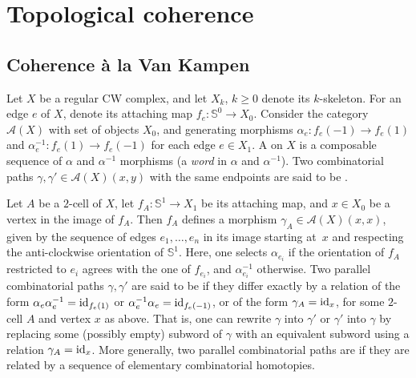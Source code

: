 
\section{Topological coherence} 
\label{s:polycoherence}


\subsection{Coherence \`a la Van Kampen}

Let $X$ be a regular CW complex, and let $X_k$, $k\geq 0$ denote its $k$-skeleton. 
For an edge $e$ of $X$, denote its attaching map $f_e : \mathbb{S}^0 \to X_0$.
Consider the category $\mathcal{A}(X)$ with set of objects $X_0$, and generating morphisms $\alpha_e: f_e(-1) \to f_e(1)$ and $\alpha_e^{-1}: f_e(1) \to f_e(-1)$ for each edge $e \in X_1$.
A  on $X$ is a composable sequence of $\alpha$ and $\alpha^{-1}$ morphisms (a \emph{word} in $\alpha$ and $\alpha^{-1}$).
Two combinatorial paths $\gamma, \gamma' \in \mathcal{A}(X)(x,y)$ with the same endpoints are said to be .


Let $A$ be a $2$-cell of $X$, let $f_A : \mathbb{S}^1 \to X_1$ be its attaching map, and $x\in X_0$ be a vertex  in the image of $f_A$. Then $f_A$ defines a morphism $\gamma_A \in \mathcal{A}(X)(x,x)$, given by the sequence of edges $e_1,\ldots,e_n$ in its image starting at~$x$ and respecting the anti-clockwise orientation of $\mathbb{S}^1$.
Here, one selects $\alpha_{e_i}$ if the orientation of $f_A$ restricted to $e_i$ agrees with the one of $f_{e_i}$, and $\alpha_{e_i}^{-1}$ otherwise.
Two parallel combinatorial paths $\gamma, \gamma'$ are said to be  if they differ exactly by a relation of the form $\alpha_e \alpha_e^{-1}=\mathrm{id}_{f_e(1)}$ or $\alpha_e^{-1} \alpha_e=\mathrm{id}_{f_e(-1)}$, or of the form
 $\gamma_A = \mathrm{id}_{x}$, for some $2$-cell $A$ and vertex $x$ as above.
That is, one can rewrite $\gamma$ into $\gamma'$ or $\gamma'$ into $\gamma$ by replacing some (possibly empty) subword of $\gamma$ with an equivalent subword using a relation $\gamma_A = \mathrm{id}_x$.
More generally, two parallel combinatorial paths are  if they are related by a sequence of elementary combinatorial homotopies.

